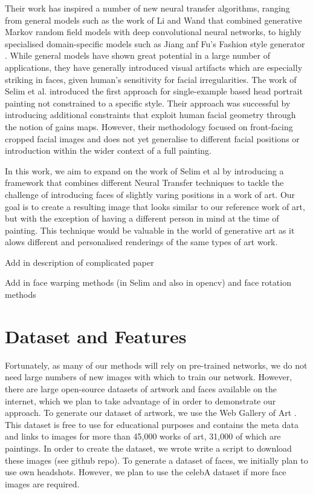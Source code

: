 \documentclass{article}
\begin{document}
Their work has inspired a number of new neural transfer algorithms, ranging from general models such as the work of Li and Wand \cite{li2016combining} that combined generative Markov random field models with deep convolutional neural networks, to highly specialised domain-specific models such as Jiang anf Fu's Fashion style generator \cite{jiang2017fashion}. While general models have shown great potential in a large number of applications, they have generally introduced visual artifacts which are especially striking in faces, given human's sensitivity for facial irregularities. The work of Selim et al. \cite{selim2016painting} introduced the first approach for single-example based head portrait painting not constrained to a specific style. Their approach was successful by introducing additional constraints that exploit human facial geometry through the notion of gains maps. However, their methodology focused on front-facing cropped facial images and does not yet generalise to different facial positions or introduction within the wider context of a full painting.

In this work, we aim to expand on the work of Selim et al by introducing a framework that combines different Neural Transfer techniques to tackle the challenge of introducing faces of slightly varing positions in a work of art. Our goal is to create a resulting image that looks similar to our reference work of art, but with the exception of having a different person in mind at the time of painting. This technique would be valuable in the world of generative art as it alows different and personalised renderings of the same types of art work. 

Add in description of complicated paper

Add in face warping methods (in Selim and also in opencv) and face rotation methods

\section{Dataset and Features}

Fortunately, as many of our methods will rely on pre-trained networks, we do not need large numbers of new images with which to train our network. However, there are large open-source datasets of artwork and faces available on the internet, which we plan to take advantage of in order to demonstrate our approach. To generate our dataset of artwork, we use the Web Gallery of Art \cite{WebGallery}. This dataset is free to use for educational purposes and contains the meta data and links to images for more than 45,000 works of art, 31,000 of which are paintings. In order to create the dataset, we wrote write a script to download these images (see github repo).  To generate a dataset of faces, we initially plan to use own headshots. However, we plan to use the celebA dataset \cite{liu2018large} if more face images are required.
\end{document}
